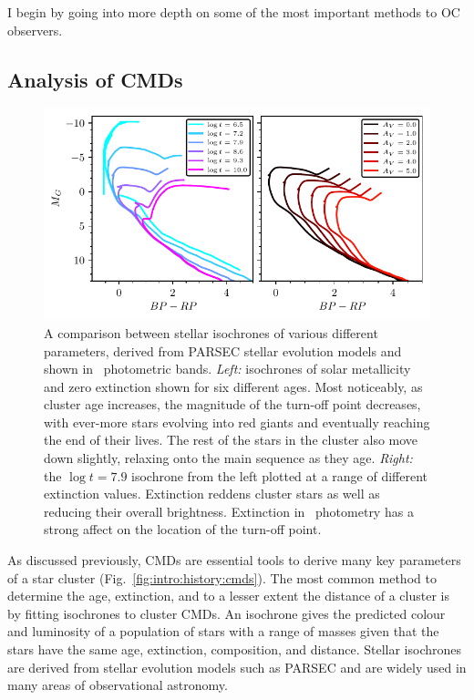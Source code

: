 I begin by going into more depth on some of the most important methods to OC observers.


\subsection{Analysis of CMDs}
\label{sec:intro:theory:cmds}

\begin{figure}[tb]
	\includegraphics[width=\textwidth]{fig/c1/isochrones.pdf}
	\caption[A comparison between stellar isochrones of various different parameters.]{A comparison between stellar isochrones of various different parameters, derived from PARSEC stellar evolution models \citep{bressan_parsec_2012} and shown in \gaia\ photometric bands. \emph{Left:} isochrones of solar metallicity and zero extinction shown for six different ages. Most noticeably, as cluster age increases, the magnitude of the turn-off point decreases, with ever-more stars evolving into red giants and eventually reaching the end of their lives. The rest of the stars in the cluster also move down slightly, relaxing onto the main sequence as they age. \emph{Right:} the $\log t = 7.9$ isochrone from the left plotted at a range of different extinction values. Extinction reddens cluster stars as well as reducing their overall brightness. Extinction in \gaia\ photometry has a strong affect on the location of the turn-off point.}
	\label{fig:intro:history:isochrones}
\end{figure}

As discussed previously, CMDs are essential tools to derive many key parameters of a star cluster (Fig.~\ref{fig:intro:history:cmds}). The most common method to determine the age, extinction, and to a lesser extent the distance of a cluster is by fitting isochrones to cluster CMDs. An isochrone gives the predicted colour and luminosity of a population of stars with a range of masses given that the stars have the same age, extinction, composition, and distance. Stellar isochrones are derived from stellar evolution models such as PARSEC \citep{bressan_parsec_2012} and are widely used in many areas of observational astronomy.

